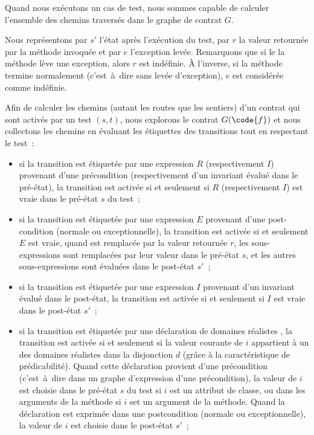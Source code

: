 Quand nous exécutons un cas de test, nous sommes capable de calculer l'ensemble
des chemins traversés dans le graphe de contrat $G$.

Nous représentons par $s'$ l'état après l'exécution du test, par $r$ la valeur
retournée par la méthode invoquée et par $e$ l'exception levée. Remarquons que
si le la méthode lève une exception, alors $r$ est indéfinie. À l'inverse, si la
méthode termine normalement (c'est~à~dire sans levée d'exception), $e$ est
considérée comme indéfinie.

Afin de calculer les chemins (autant les routes que les sentiers) d'un contrat
qui sont activés par un test $(s, t)$, nous explorons le contrat $G(\code{f})$
et nous collectons les chemins en évaluant les étiquettes des transitions tout
en respectant le test~:
%
\begin{itemize}

\item si la transition est étiquetée par une expression $R$ (respectivement
$I$) provenant d'une précondition (respectivement d'un invariant évalué dans le
pré-état), la transition est activée si et seulement si $R$ (respectivement $I$)
est vraie dans le pré-état $s$ du test~;

\item si la transition est étiquetée par une expression $E$ provenant d'une
post-condition (normale ou exceptionnelle), la transition est activée si et
seulement $E$ est vraie, quand \aresult est remplacée par la valeur retournée
$r$, les sous-expressions \aold{\empty} sont remplacées par leur valeur dans le
pré-état $s$, et les autres sous-expressions sont évaluées dans le post-état
$s'$~;

\item si la transition est étiquetée par une expression $I$ provenant d'un
invariant évalué dans le post-état, la transition est activée si et seulement si
$I$ est vraie dans le post-état $s'$~;

\item si la transition est étiquetée par une déclaration de domaines réalistes
, la transition est activée si et seulement si la valeur courante
de $i$ appartient à un des domaines réalistes dans la disjonction $d$ (grâce à
la caractéristique de prédicabilité). Quand cette déclaration provient d'une
précondition (c'est~à~dire dans un graphe d'expression d'une précondition), la
valeur de $i$ est choisie dans le pré-état $s$ du test si $i$ est un attribut de
classe, ou dans les arguments de la méthode si $i$ set un argument de la
méthode. Quand la déclaration est exprimée dans une postcondition (normale ou
exceptionnelle), la valeur de $i$ est choisie dans le post-état $s'$~;


\end{itemize}
